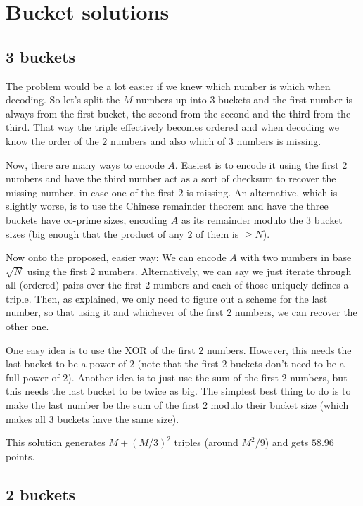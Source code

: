 \documentclass{article}
\begin{document}
\section{Bucket solutions}

\subsection{3 buckets}

The problem would be a lot easier if we knew which number is which when decoding. So let's split the $M$ numbers up into $3$ buckets and the first number is always from the first bucket, the second from the second and the third from the third. That way the triple effectively becomes ordered and when decoding we know the order of the $2$ numbers and also which of $3$ numbers is missing.

Now, there are many ways to encode $A$. Easiest is to encode it using the first $2$ numbers and have the third number act as a sort of checksum to recover the missing number, in case one of the first $2$ is missing. An alternative, which is slightly worse, is to use the Chinese remainder theorem and have the three buckets have co-prime sizes, encoding $A$ as its remainder modulo the $3$ bucket sizes (big enough that the product of any $2$ of them is $\geq N$).

Now onto the proposed, easier way: We can encode $A$ with two numbers in base $\sqrt N$ using the first $2$ numbers. Alternatively, we can say we just iterate through all (ordered) pairs over the first $2$ numbers and each of those uniquely defines a triple. Then, as explained, we only need to figure out a scheme for the last number, so that using it and whichever of the first $2$ numbers, we can recover the other one.

One easy idea is to use the XOR of the first $2$ numbers. However, this needs the last bucket to be a power of $2$ (note that the first $2$ buckets don't need to be a full power of $2$). Another idea is to just use the sum of the first $2$ numbers, but this needs the last bucket to be twice as big. The simplest best thing to do is to make the last number be the sum of the first $2$ modulo their bucket size (which makes all $3$ buckets have the same size).

This solution generates $M + (M / 3)^2$ triples (around $M^2 / 9$) and gets $58.96$ points.

\subsection{2 buckets}
\end{document}
